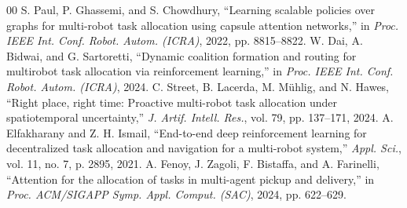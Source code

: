 \documentclass[conference]{IEEEtran}
\begin{document}
\begin{thebibliography}{00}
 S. Paul, P. Ghassemi, and S. Chowdhury, ``Learning scalable policies over graphs for multi-robot task allocation using capsule attention networks,'' in \textit{Proc. IEEE Int. Conf. Robot. Autom. (ICRA)}, 2022, pp. 8815--8822.
 W. Dai, A. Bidwai, and G. Sartoretti, ``Dynamic coalition formation and routing for multirobot task allocation via reinforcement learning,'' in \textit{Proc. IEEE Int. Conf. Robot. Autom. (ICRA)}, 2024.
 C. Street, B. Lacerda, M. Mühlig, and N. Hawes, ``Right place, right time: Proactive multi-robot task allocation under spatiotemporal uncertainty,'' \textit{J. Artif. Intell. Res.}, vol. 79, pp. 137--171, 2024.
 A. Elfakharany and Z. H. Ismail, ``End-to-end deep reinforcement learning for decentralized task allocation and navigation for a multi-robot system,'' \textit{Appl. Sci.}, vol. 11, no. 7, p. 2895, 2021.
 A. Fenoy, J. Zagoli, F. Bistaffa, and A. Farinelli, ``Attention for the allocation of tasks in multi-agent pickup and delivery,'' in \textit{Proc. ACM/SIGAPP Symp. Appl. Comput. (SAC)}, 2024, pp. 622--629.
\end{thebibliography}
\end{document}
